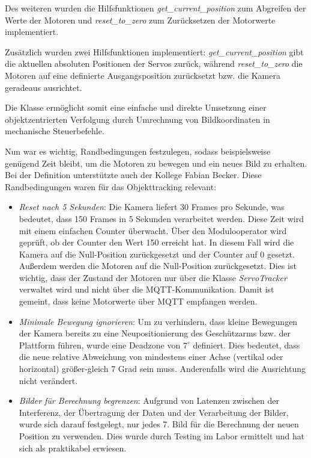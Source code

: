 Des weiteren wurden die Hilfsfunktionen \textit{get\_current\_position} zum Abgreifen der Werte der Motoren und \textit{reset\_to\_zero} zum Zurücksetzen der Motorwerte implementiert.

Zusätzlich wurden zwei Hilfsfunktionen implementiert: \textit{get\_current\_position} gibt die aktuellen absoluten Positionen der Servos zurück, während \textit{reset\_to\_zero} die Motoren auf eine definierte Ausgangsposition zurücksetzt bzw. die Kamera geradeaus ausrichtet.

Die Klasse ermöglicht somit eine einfache und direkte Umsetzung einer objektzentrierten Verfolgung durch Umrechnung von Bildkoordinaten in mechanische Steuerbefehle.

Nun war es wichtig, Randbedingungen festzulegen, sodass beispielsweise genügend Zeit bleibt, um die Motoren zu bewegen und ein neues Bild zu erhalten. Bei der Definition unterstützte auch der Kollege Fabian Becker. Diese Randbedingungen waren für das Objekttracking relevant:

\begin{itemize}
    \item \textit{Reset nach 5 Sekunden}: Die Kamera liefert 30 Frames pro Sekunde, was bedeutet, dass 150 Frames in 5 Sekunden verarbeitet werden. Diese Zeit wird mit einem einfachen Counter überwacht. Über den Modulooperator wird geprüft, ob der Counter den Wert 150 erreicht hat. In diesem Fall wird die Kamera auf die Null-Position zurückgesetzt und der Counter auf 0 gesetzt. Außerdem werden die Motoren auf die Null-Position zurückgesetzt. Dies ist wichtig, dass der Zustand der Motoren nur über die Klasse \textit{ServoTracker} verwaltet wird und nicht über die MQTT-Kommunikation. Damit ist gemeint, dass keine Motorwerte über MQTT empfangen werden.
    
    \item \textit{Minimale Bewegung ignorieren}: Um zu verhindern, dass kleine Bewegungen der Kamera bereits zu eine Neupositionierung des Geschützarms bzw. der Plattform führen, wurde eine Deadzone von $7^\circ$ definiert. Dies bedeutet, dass die neue relative Abweichung von mindestens einer Achse (vertikal oder horizontal) größer-gleich 7 Grad sein muss. Anderenfalls wird die Ausrichtung nicht verändert.
    
    \item \textit{Bilder für Berechnung begrenzen}: Aufgrund von Latenzen zwischen der Interferenz, der Übertragung der Daten und der Verarbeitung der Bilder, wurde sich darauf festgelegt, nur jedes 7. Bild für die Berechnung der neuen Position zu verwenden. Dies wurde durch Testing im Labor ermittelt und hat sich als praktikabel erwiesen.
\end{itemize}

